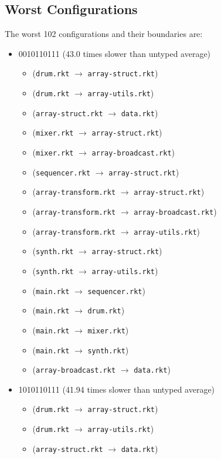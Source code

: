 \documentclass{article}
\newcommand{\mono}[1]{\texttt{#1}}
\begin{document}
\subsection{Worst Configurations}
The worst 102 configurations and their boundaries are:
\begin{itemize}
\item 0010110111 (43.0 times slower than untyped average)
  \begin{itemize}
  \item (\mono{drum.rkt} $\rightarrow$ \mono{array-struct.rkt})
  \item (\mono{drum.rkt} $\rightarrow$ \mono{array-utils.rkt})
  \item (\mono{array-struct.rkt} $\rightarrow$ \mono{data.rkt})
  \item (\mono{mixer.rkt} $\rightarrow$ \mono{array-struct.rkt})
  \item (\mono{mixer.rkt} $\rightarrow$ \mono{array-broadcast.rkt})
  \item (\mono{sequencer.rkt} $\rightarrow$ \mono{array-struct.rkt})
  \item (\mono{array-transform.rkt} $\rightarrow$ \mono{array-struct.rkt})
  \item (\mono{array-transform.rkt} $\rightarrow$ \mono{array-broadcast.rkt})
  \item (\mono{array-transform.rkt} $\rightarrow$ \mono{array-utils.rkt})
  \item (\mono{synth.rkt} $\rightarrow$ \mono{array-struct.rkt})
  \item (\mono{synth.rkt} $\rightarrow$ \mono{array-utils.rkt})
  \item (\mono{main.rkt} $\rightarrow$ \mono{sequencer.rkt})
  \item (\mono{main.rkt} $\rightarrow$ \mono{drum.rkt})
  \item (\mono{main.rkt} $\rightarrow$ \mono{mixer.rkt})
  \item (\mono{main.rkt} $\rightarrow$ \mono{synth.rkt})
  \item (\mono{array-broadcast.rkt} $\rightarrow$ \mono{data.rkt})
  \end{itemize}
\item 1010110111 (41.94 times slower than untyped average)
  \begin{itemize}
  \item (\mono{drum.rkt} $\rightarrow$ \mono{array-struct.rkt})
  \item (\mono{drum.rkt} $\rightarrow$ \mono{array-utils.rkt})
  \item (\mono{array-struct.rkt} $\rightarrow$ \mono{data.rkt})

\end{itemize}
\end{itemize}
\end{document}
